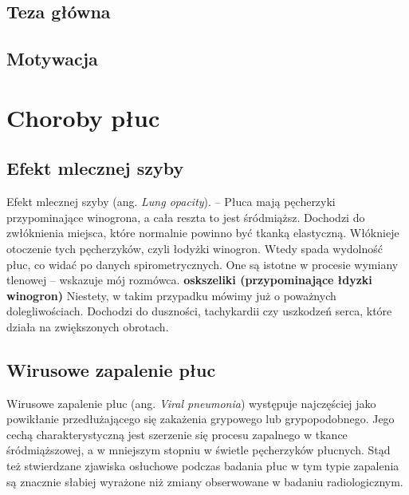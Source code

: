 \documentclass{article}
\begin{document}
\subsection{Teza główna}

\subsection{Motywacja}


\section{Choroby płuc}

\subsection{Efekt mlecznej szyby}
Efekt mlecznej szyby (ang. \textit{Lung opacity}). – Płuca mają pęcherzyki przypominające winogrona, a cała reszta to jest śródmiąższ. Dochodzi do zwłóknienia miejsca, które normalnie powinno być tkanką elastyczną. Włóknieje otoczenie tych pęcherzyków, czyli łodyżki winogron. Wtedy spada wydolność płuc, co widać po danych spirometrycznych. One są istotne w procesie wymiany tlenowej – wskazuje mój rozmówca. \textbf{oskszeliki (przypominające łdyzki winogron) }
Niestety, w takim przypadku mówimy już o poważnych dolegliwościach. Dochodzi do duszności, tachykardii czy uszkodzeń serca, które działa na zwiększonych obrotach.


\subsection{Wirusowe zapalenie płuc}
Wirusowe zapalenie płuc (ang. \textit{Viral pneumonia}) występuje najczęściej jako powikłanie przedłużającego się zakażenia grypowego lub grypopodobnego. Jego cechą charakterystyczną jest szerzenie się procesu zapalnego w tkance śródmiąższowej, a w mniejszym stopniu w świetle pęcherzyków płucnych. Stąd też stwierdzane zjawiska osłuchowe podczas badania płuc w tym typie zapalenia są znacznie słabiej wyrażone niż zmiany obserwowane w badaniu radiologicznym.
\end{document}
